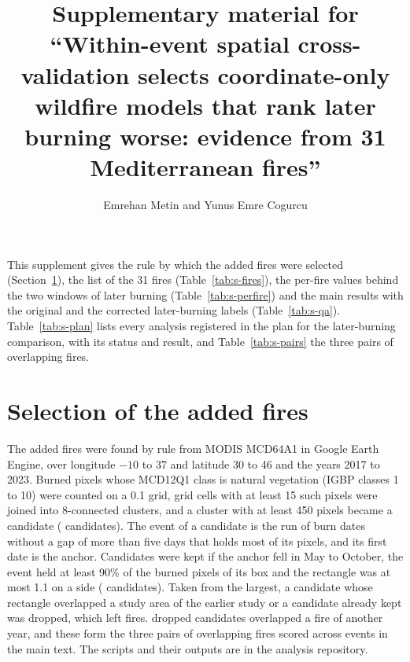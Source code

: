\documentclass[11pt]{article}
\title{Supplementary material for ``Within-event spatial cross-validation selects coordinate-only wildfire models that rank later burning worse: evidence from 31 Mediterranean fires''}
\author{Emrehan Metin and Yunus Emre Cogurcu}
\date{}
\begin{document}
\maketitle

This supplement gives the rule by which the added fires were selected (Section~\ref{sec:s-selection}), the list of the 31 fires (Table~\ref{tab:s-fires}), the per-fire values behind the two windows of later burning (Table~\ref{tab:s-perfire}) and the main results with the original and the corrected later-burning labels (Table~\ref{tab:s-qa}). Table~\ref{tab:s-plan} lists every analysis registered in the plan for the later-burning comparison, with its status and result, and Table~\ref{tab:s-pairs} the three pairs of overlapping fires.

\section{Selection of the added fires}
\label{sec:s-selection}

The added fires were found by rule from MODIS MCD64A1 in Google Earth Engine, over longitude $-10$ to 37 and latitude 30 to 46 and the years 2017 to 2023. Burned pixels whose MCD12Q1 class is natural vegetation (IGBP classes 1 to 10) were counted on a 0.1\textdegree{} grid, grid cells with at least 15 such pixels were joined into 8-connected clusters, and a cluster with at least 450 pixels became a candidate (\vselCandidates{} candidates). The event of a candidate is the run of burn dates without a gap of more than five days that holds most of its pixels, and its first date is the anchor. Candidates were kept if the anchor fell in May to October, the event held at least 90\% of the burned pixels of its box and the rectangle was at most 1.1\textdegree{} on a side (\vselPass{} candidates). Taken from the largest, a candidate whose rectangle overlapped a study area of the earlier study or a candidate already kept was dropped, which left \vselKept{} fires. \vselRepeat{} dropped candidates overlapped a fire of another year, and these form the three pairs of overlapping fires scored across events in the main text. The scripts and their outputs are in the analysis repository.


\end{document}
